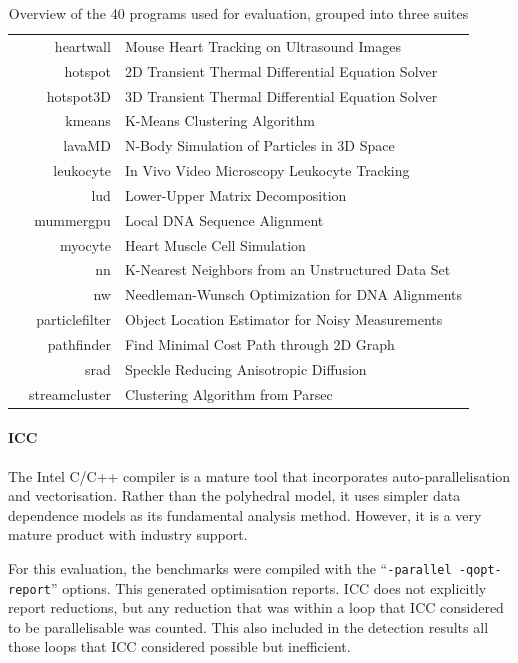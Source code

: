 \begin{table}[H]
\begin{tabular}{lrl}
 & heartwall      & Mouse Heart Tracking on Ultrasound Images\\[-2.12mm]
 & hotspot        & 2D Transient Thermal Differential Equation Solver\\[-2.12mm]
 & hotspot3D      & 3D Transient Thermal Differential Equation Solver\\[-2.12mm]
 & kmeans         & K-Means Clustering Algorithm\\[-2.12mm]
 & lavaMD         & N-Body Simulation of Particles in 3D Space\\[-2.12mm]
 & leukocyte      & In Vivo Video Microscopy Leukocyte Tracking\\[-2.12mm]
 & lud            & Lower-Upper Matrix Decomposition\\[-2.12mm]
 & mummergpu      & Local DNA Sequence Alignment\\[-2.12mm]
 & myocyte        & Heart Muscle Cell Simulation\\[-2.12mm]
 & nn             & K-Nearest Neighbors from an Unstructured Data Set \\[-2.12mm]
 & nw             & Needleman-Wunsch Optimization for DNA Alignments\\[-2.12mm]
 & particlefilter & Object Location Estimator for Noisy Measurements\\[-2.12mm]
 & pathfinder     & Find Minimal Cost Path through 2D Graph\\[-2.12mm]
 & srad           & Speckle Reducing Anisotropic Diffusion\\[-2.12mm]
 & streamcluster  & Clustering Algorithm from Parsec\\
\bottomrule
\end{tabular}
\caption{Overview of the 40 programs used for evaluation, grouped into three
         suites}
\label{allbenchmarklist}
\end{table}

\paragraph*{ICC}

    The Intel C/C++ compiler is a mature tool that incorporates
    auto-parallelisation and vectorisation.
    Rather than the polyhedral model, it uses simpler data dependence models as
    its fundamental analysis method.
    However, it is a very mature product with industry support.

    For this evaluation, the benchmarks were compiled with the
    ``{\tt-parallel -qopt-report}'' options.
    This generated optimisation reports.
    ICC does not explicitly report reductions, but any reduction that was
    within a loop that ICC considered to be parallelisable was counted.
    This also included in the detection results all those loops that ICC
    considered possible but inefficient.

